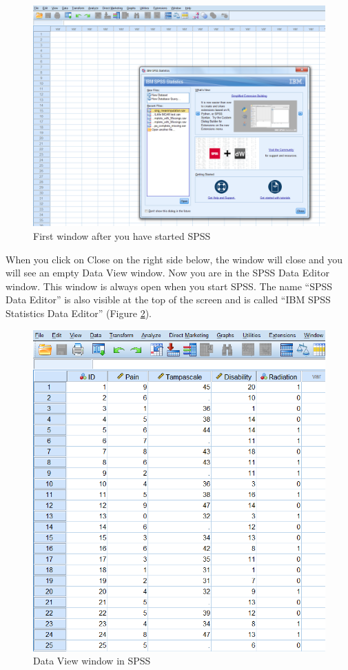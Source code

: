 \documentclass[]{book}
\begin{document}
\begin{figure}

{\centering \includegraphics[width=0.9\linewidth]{images/fig1.1} 

}

\caption{First window after you have started SPSS}\label{fig:fig1}
\end{figure}

When you click on Close on the right side below, the window will close
and you will see an empty Data View window. Now you are in the SPSS Data
Editor window. This window is always open when you start SPSS. The name
``SPSS Data Editor'' is also visible at the top of the screen and is
called ``IBM SPSS Statistics Data Editor'' (Figure \ref{fig:fig2}).

\begin{figure}

{\centering \includegraphics[width=0.9\linewidth]{images/fig1.2} 

}

\caption{Data View window in SPSS}\label{fig:fig2}
\end{figure}
\end{document}
